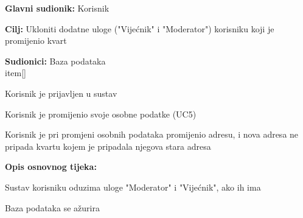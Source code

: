 					\noindent {}
					\begin{packed_item}
	
						\item \textbf{Glavni sudionik: }Korisnik
						\item  \textbf{Cilj:} Ukloniti dodatne uloge ("Vijećnik" i "Moderator") korisniku koji je promijenio kvart
						\item  \textbf{Sudionici:} Baza podataka
						\\item[] \begin{packed_enum}
							\item Korisnik je prijavljen u sustav
							\item Korisnik je promijenio svoje osobne podatke (UC5)
							\item Korisnik je pri promjeni osobnih podataka promijenio adresu, i nova adresa ne pripada kvartu kojem je pripadala njegova stara adresa
						\end{packed_enum}
						\item  \textbf{Opis osnovnog tijeka:}
						
						\item[] \begin{packed_enum}
	
							\item Sustav korisniku oduzima uloge "Moderator" i "Vijećnik", ako ih ima
							\item Baza podataka se ažurira
						\end{packed_enum}
					\end{packed_item}

